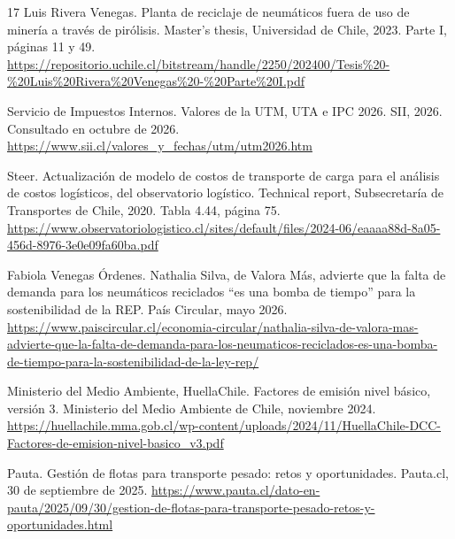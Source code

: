 \documentclass[letterpaper]{article}
\begin{document}
{\begin{thebibliography}{17}
Luis Rivera Venegas. Planta de reciclaje de neumáticos fuera de uso de minería a través de pirólisis. Master’s thesis, Universidad de Chile, 2023. Parte I, páginas 11 y 49. \url{https://repositorio.uchile.cl/bitstream/handle/2250/202400/Tesis\%20-\%20Luis\%20Rivera\%20Venegas\%20-\%20Parte\%20I.pdf}

Servicio de Impuestos Internos. Valores de la UTM, UTA e IPC 2026. SII, 2026. Consultado en octubre de 2026. \url{https://www.sii.cl/valores_y_fechas/utm/utm2026.htm}

Steer. Actualización de modelo de costos de transporte de carga para el análisis de costos logísticos, del observatorio logístico. Technical report, Subsecretaría de Transportes de Chile, 2020. Tabla 4.44, página 75. \url{https://www.observatoriologistico.cl/sites/default/files/2024-06/eaaaa88d-8a05-456d-8976-3e0e09fa60ba.pdf}

Fabiola Venegas Órdenes. Nathalia Silva, de Valora Más, advierte que la falta de demanda para los neumáticos reciclados “es una bomba de tiempo” para la sostenibilidad de la REP. País Circular, mayo 2026. \url{https://www.paiscircular.cl/economia-circular/nathalia-silva-de-valora-mas-advierte-que-la-falta-de-demanda-para-los-neumaticos-reciclados-es-una-bomba-de-tiempo-para-la-sostenibilidad-de-la-ley-rep/}


Ministerio del Medio Ambiente, HuellaChile. Factores de emisión nivel básico, versión 3. Ministerio del Medio Ambiente de Chile, noviembre 2024. \url{https://huellachile.mma.gob.cl/wp-content/uploads/2024/11/HuellaChile-DCC-Factores-de-emision-nivel-basico_v3.pdf}

Pauta. Gestión de flotas para transporte pesado: retos y oportunidades. Pauta.cl, 30 de septiembre de 2025. \url{https://www.pauta.cl/dato-en-pauta/2025/09/30/gestion-de-flotas-para-transporte-pesado-retos-y-oportunidades.html}

\end{thebibliography}
}
\end{document}

